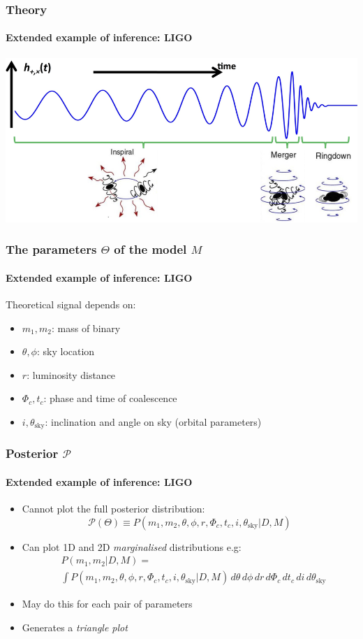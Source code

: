 \documentclass[%
]{beamer}
\begin{document}
\begin{frame}
    \frametitle{Theory}
    \framesubtitle{Extended example of inference: LIGO}
    \includegraphics[width=\textwidth]{./figures/ligo_schematic.png}
\end{frame}

\begin{frame}
    \frametitle{The parameters $\Theta$ of the model $M$}
    \framesubtitle{Extended example of inference: LIGO}
    Theoretical signal depends on:
    \begin{itemize}
        \item $m_1, m_2$: mass of binary
        \item $\theta, \phi$: sky location
        \item $r$: luminosity distance 
        \item $\Phi_c, t_c$: phase and time of coalescence
        \item $i, \theta_\text{sky}$: inclination and angle on sky (orbital parameters)
    \end{itemize}
\end{frame}



\begin{frame}
    \frametitle{Posterior $\mathcal{P}$}
    \framesubtitle{Extended example of inference: LIGO}
    \begin{itemize}
        \item Cannot plot the full posterior distribution:
            \[\mathcal{P}(\Theta) \equiv P(m_1,m_2,\theta,\phi,r,\Phi_c, t_c, i, \theta_\text{sky}|D,M)\]
        \item Can plot 1D and 2D {\em marginalised\/} distributions e.g:
            \begin{align}
            &P(m_1,m_2|D,M)=\nonumber\\&\int P(m_1,m_2,\theta,\phi,r,\Phi_c, t_c, i, \theta_\text{sky}|D,M) \,d\theta \,d\phi \,dr \,d\Phi_c \,d t_c \,d i \,d\theta_\text{sky}\nonumber
            \end{align}
        \item May do this for each pair of parameters
        \item Generates a {\em triangle plot}
    \end{itemize}
\end{frame}
\end{document}
